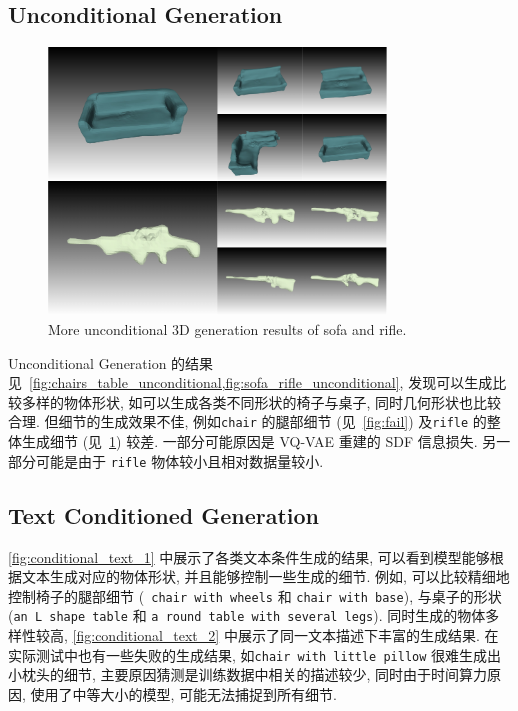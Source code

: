 \documentclass[11pt]{article}
\newcommand\1{\mathds{1}}
\begin{document}
\subsection{Unconditional Generation}
\begin{figure}[htbp]
    \centering
    \includegraphics[width=0.8\textwidth]{imgs/sofa_rifle.pdf}
    \caption{More unconditional 3D generation results of sofa and rifle. }
    \label{fig:sofa_rifle_unconditional} 
\end{figure}

Unconditional Generation 的结果见~\cref{fig:chairs_table_unconditional,fig:sofa_rifle_unconditional}, 发现可以生成比较多样的物体形状, 如可以生成各类不同形状的椅子与桌子, 同时几何形状也比较合理.
但细节的生成效果不佳, 例如\texttt{chair} 的腿部细节 (见~\cref{fig:fail}) 及\texttt{rifle} 的整体生成细节 (见~\cref{fig:sofa_rifle_unconditional}) 较差. 一部分可能原因是 VQ-VAE 重建的 SDF 信息损失. 
另一部分可能是由于 \texttt{rifle} 物体较小且相对数据量较小.

\subsection{Text Conditioned Generation}
\cref{fig:conditional_text_1} 中展示了各类文本条件生成的结果, 可以看到模型能够根据文本生成对应的物体形状, 并且能够控制一些生成的细节. 例如, 可以比较精细地控制椅子的腿部细节 (\texttt{ chair with wheels} 和 \texttt{chair with base}), 与桌子的形状 (\texttt{an L shape table} 和 \texttt{a round table with several legs}).
同时生成的物体多样性较高, \cref{fig:conditional_text_2} 中展示了同一文本描述下丰富的生成结果. 在实际测试中也有一些失败的生成结果, 如\texttt{chair with little pillow} 很难生成出小枕头的细节, 主要原因猜测是训练数据中相关的描述较少, 同时由于时间算力原因, 使用了中等大小的模型, 可能无法捕捉到所有细节.
\end{document}
